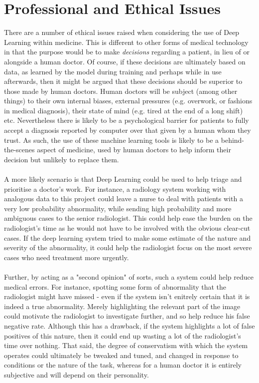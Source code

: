 \documentclass[11pt]{article} %
\theoremstyle{plain}
\theoremstyle{definition}
\begin{document}
\section{Professional and Ethical Issues}
There are a number of ethical issues raised when considering the use of Deep Learning within medicine. This is different to other forms of medical technology in that the purpose would be to make \textit{decisions} regarding a patient, in lieu of or alongside a human doctor. Of course, if these decisions are ultimately based on data, as learned by the model during training and perhaps while in use afterwards, then it might be argued that these decisions should be superior to those made by human doctors. Human doctors will be subject (among other things) to their own internal biases, external pressures (e.g. overwork, or fashions in medical diagnosis), their state of mind (e.g. tired at the end of a long shift) etc. Nevertheless there is likely to be a psychological barrier for patients to fully accept a diagnosis reported by computer over that given by a human whom they trust. As such, the use of these machine learning tools is likely to be a behind-the-scenes aspect of medicine, used by human doctors to help inform their decision but unlikely to replace them.
\\
\\
\noindent
A more likely scenario is that Deep Learning could be used to help triage and prioritise a doctor's work. For instance, a radiology system working with analogous data to this project could leave a nurse to deal with patients with a very low probability abnormality, while sending high probability and more ambiguous cases to the senior radiologist. This could help ease the burden on the radiologist's time as he would not have to be involved with the obvious clear-cut cases. If the deep learning system tried to make some estimate of the nature and severity of the abnormality, it could help the radiologist focus on the most severe cases who need treatment more urgently.   
\\
\\
\noindent
Further, by acting as a "second opinion" of sorts, such a system could help reduce medical errors. For instance, spotting some form of abnormality that the radiologist might have missed - even if the system isn't enitrely certain that it is indeed a true abnormality. Merely highlighting the relevant part of the image could motivate the radiologist to investigate further, and so help reduce his false negative rate. Although this has a drawback, if the system highlights a lot of false positives of this nature, then it could end up wasting a lot of the radiologist's time over nothing. That said, the degree of conservatism with which the system operates could ultimately be tweaked and tuned, and changed in response to conditions or the nature of the task, whereas for a human doctor it is entirely subjective and will depend on their personality.   
\end{document}

